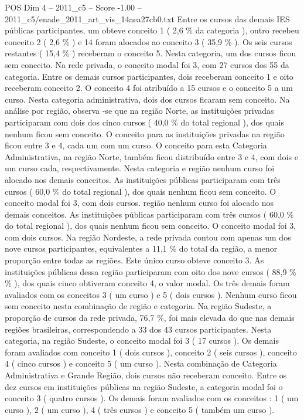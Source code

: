 \begin{textsample}{POS Dim 4 – 2011\_c5 – Score -1.00 – 2011\_c5/enade\_2011\_art\_vis\_14aea27cb0.txt}
Entre os cursos das demais IES públicas participantes, um obteve conceito 1 ( 2,6 \% da categoria ), outro recebeu conceito 2 ( 2,6 \% ) e 14 foram alocados ao conceito 3 ( 35,9 \% ).
Os seis cursos restantes ( 15,4 \% ) receberam o conceito 5.
Nesta categoria, um dos cursos ficou sem conceito.
Na rede privada, o conceito modal foi 3, com 27 cursos dos 55 da categoria.
Entre os demais cursos participantes, dois receberam conceito 1 e oito receberam conceito 2.
O conceito 4 foi atribuído a 15 cursos e o conceito 5 a um curso.
Nesta categoria administrativa, dois dos cursos ficaram sem conceito.
Na análise por região, observa -se que na região Norte, as instituições privadas participaram com dois dos cinco cursos ( 40,0 \% do total regional ), dos quais nenhum ficou sem conceito.
O conceito para as instituições privadas na região ficou entre 3 e 4, cada um com um curso.
O conceito para esta Categoria Administrativa, na região Norte, também ficou distribuído entre 3 e 4, com dois e um curso cada, respectivamente.
Nesta categoria e região nenhum curso foi alocado nos demais conceitos.
As instituições públicas participaram com três cursos ( 60,0 \% do total regional ), dos quais nenhum ficou sem conceito.
O conceito modal foi 3, com dois cursos. região nenhum curso foi alocado nos demais conceitos.
As instituições públicas participaram com três cursos ( 60,0 \% do total regional ), dos quais nenhum ficou sem conceito.
O conceito modal foi 3, com dois cursos.
Na região Nordeste, a rede privada contou com apenas um dos nove cursos participantes, equivalentes a 11,1 \% do total da região, a menor proporção entre todas as regiões.
Este único curso obteve conceito 3.
As instituições públicas dessa região participaram com oito dos nove cursos ( 88,9 \% \% ), dos quais cinco obtiveram conceito 4, o valor modal.
Os três demais foram avaliados com os conceitos 3 ( um curso ) e 5 ( dois cursos ).
Nenhum curso ficou sem conceito nesta combinação de região e categoria.
Na região Sudeste, a proporção de cursos da rede privada, 76,7 \%, foi mais elevada do que nas demais regiões brasileiras, correspondendo a 33 dos 43 cursos participantes.
Nesta categoria, na região Sudeste, o conceito modal foi 3 ( 17 cursos ).
Os demais foram avaliados com conceito 1 ( dois cursos ), conceito 2 ( seis cursos ), conceito 4 ( cinco cursos ) e conceito 5 ( um curso ).
Nesta combinação de Categoria Administrativa e Grande Região, dois cursos não receberam conceito.
Entre os dez cursos em instituições públicas na região Sudeste, a categoria modal foi o conceito 3 ( quatro cursos ).
Os demais foram avaliados com os conceitos : 1 ( um curso ), 2 ( um curso ), 4 ( três cursos ) e conceito 5 ( também um curso ).

\end{textsample}
